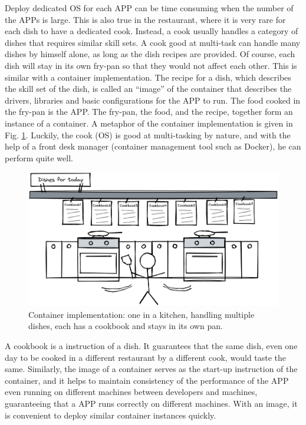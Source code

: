 Deploy dedicated OS for each APP can be time consuming when the number of the APPs is large. This is also true in the restaurant, where it is very rare for each dish to have a dedicated cook. Instead, a cook usually handles a category of dishes that requires similar skill sets. A cook good at multi-task can handle many dishes by himself alone, as long as the dish recipes are provided. Of course, each dish will stay in its own fry-pan so that they would not affect each other. This is similar with a container implementation. The recipe for a dish, which describes the skill set of the dish, is called an ``image'' of the container that describes the drivers, libraries and basic configurations for the APP to run. The food cooked in the fry-pan is the APP. The fry-pan, the food, and the recipe, together form an instance of a container. A metaphor of the container implementation is given in Fig. \ref{ch:vac:fig:multitaskcook}. Luckily, the cook (OS) is good at multi-tasking by nature, and with the help of a front desk manager (container management tool such as Docker), he can perform quite well.
\begin{figure}
	\centering
	\includegraphics[width=350pt]{chapters/ch_virtualization_and_containerization/figures/multitaskcook.png}
	\caption{Container implementation: one in a kitchen, handling multiple dishes, each has a cookbook and stays in its own pan.} \label{ch:vac:fig:multitaskcook}
\end{figure}

A cookbook is a instruction of a dish. It guarantees that the same dish, even one day to be cooked in a different restaurant by a different cook, would taste the same. Similarly, the image of a container serves as the start-up instruction of the container, and it helps to maintain consistency of the performance of the APP even running on different machines between developers and machines, guaranteeing that a APP runs correctly on different machines. With an image, it is convenient to deploy similar container instances quickly.

